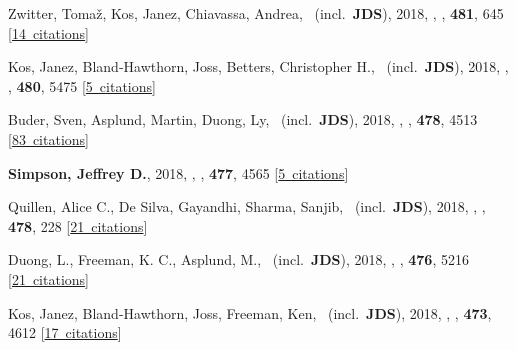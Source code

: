 \item[{\color{numcolor}\scriptsize21}] Zwitter, Toma{\v{z}}, Kos, Janez, Chiavassa, Andrea, \etal\ (incl.\ \textbf{JDS}), 2018, , \mnras, \textbf{481}, 645 [\href{https://ui.adsabs.harvard.edu/#abs/2018MNRAS.481..645Z}{14~citations}]

\item[{\color{numcolor}\scriptsize20}] Kos, Janez, Bland-Hawthorn, Joss, Betters, Christopher H., \etal\ (incl.\ \textbf{JDS}), 2018, , \mnras, \textbf{480}, 5475 [\href{https://ui.adsabs.harvard.edu/#abs/2018MNRAS.480.5475K}{5~citations}]

\item[{\color{numcolor}\scriptsize19}] Buder, Sven, Asplund, Martin, Duong, Ly, \etal\ (incl.\ \textbf{JDS}), 2018, , \mnras, \textbf{478}, 4513 [\href{https://ui.adsabs.harvard.edu/#abs/2018MNRAS.478.4513B}{83~citations}]

\item[{\color{numcolor}\scriptsize18}] \textbf{Simpson, Jeffrey D.}, 2018, , \mnras, \textbf{477}, 4565 [\href{https://ui.adsabs.harvard.edu/#abs/2018MNRAS.477.4565S}{5~citations}]

\item[{\color{numcolor}\scriptsize17}] Quillen, Alice C., De Silva, Gayandhi, Sharma, Sanjib, \etal\ (incl.\ \textbf{JDS}), 2018, , \mnras, \textbf{478}, 228 [\href{https://ui.adsabs.harvard.edu/#abs/2018MNRAS.478..228Q}{21~citations}]

\item[{\color{numcolor}\scriptsize16}] Duong, L., Freeman, K. C., Asplund, M., \etal\ (incl.\ \textbf{JDS}), 2018, , \mnras, \textbf{476}, 5216 [\href{https://ui.adsabs.harvard.edu/#abs/2018MNRAS.476.5216D}{21~citations}]

\item[{\color{numcolor}\scriptsize15}] Kos, Janez, Bland-Hawthorn, Joss, Freeman, Ken, \etal\ (incl.\ \textbf{JDS}), 2018, , \mnras, \textbf{473}, 4612 [\href{https://ui.adsabs.harvard.edu/#abs/2018MNRAS.473.4612K}{17~citations}]

